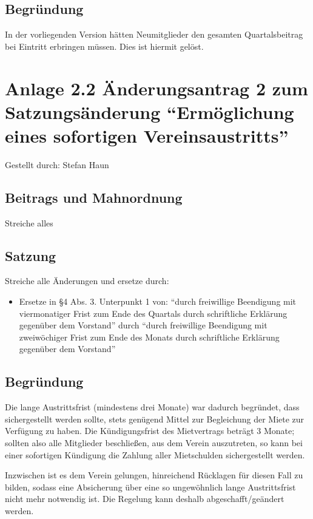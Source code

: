 \documentclass[a4paper,12pt,titlepage]{scrartcl}
\begin{document}
\subsection*{Begründung}
In der vorliegenden Version hätten Neumitglieder den gesamten Quartalsbeitrag bei Eintritt erbringen müssen. Dies ist hiermit gelöst.

\newpage

\section*{Anlage 2.2 Änderungsantrag 2 zum Satzungsänderung “Ermöglichung eines sofortigen Vereinsaustritts”}

Gestellt durch: Stefan Haun

\subsection*{Beitrags und Mahnordnung}
Streiche alles

\subsection*{Satzung}
Streiche alle Änderungen und ersetze durch:
\begin{itemize}
 	\item Ersetze in §4 Abs. 3. Unterpunkt 1 von: “durch freiwillige Beendigung mit viermonatiger Frist zum Ende des Quartals durch schriftliche Erklärung gegenüber dem Vorstand” durch “durch freiwillige Beendigung mit zweiwöchiger Frist zum Ende des Monats durch schriftliche Erklärung gegenüber dem Vorstand”
\end{itemize}

\subsection*{Begründung}
Die lange Austrittsfrist (mindestens drei Monate) war dadurch begründet, dass sichergestellt werden sollte,
stets genügend Mittel zur Begleichung der Miete zur Verfügung zu haben. Die Kündigungsfrist des Mietvertrags beträgt
3 Monate; sollten also alle Mitglieder beschließen, aus dem Verein auszutreten, so kann bei einer sofortigen Kündigung
die Zahlung aller Mietschulden sichergestellt werden.

Inzwischen ist es dem Verein gelungen, hinreichend Rücklagen für diesen Fall zu bilden, sodass eine Absicherung über
eine so ungewöhnlich lange Austrittsfrist nicht mehr notwendig ist. Die Regelung kann deshalb abgeschafft/geändert
werden.
\end{document}
